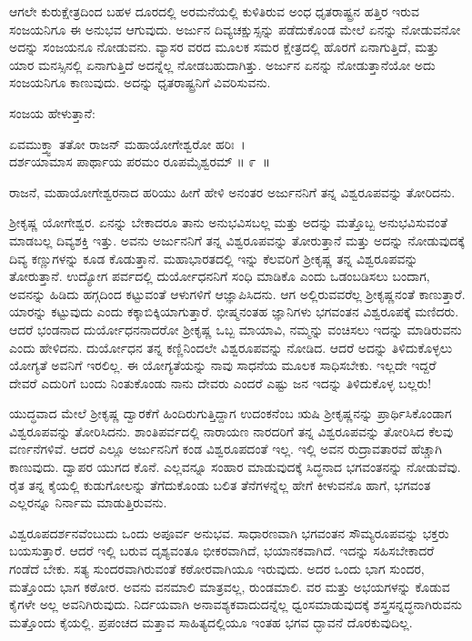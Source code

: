 ಆಗಲೇ ಕುರುಕ್ಷೇತ್ರದಿಂದ ಬಹಳ ದೂರದಲ್ಲಿ ಅರಮನೆಯಲ್ಲಿ ಕುಳಿತಿರುವ ಅಂಧ ಧೃತರಾಷ್ಟ್ರನ ಹತ್ತಿರ ಇರುವ ಸಂಜಯನಿಗೂ ಈ ಅನುಭವ ಆಗುವುದು. ಅರ್ಜುನ ದಿವ್ಯಚಕ್ಷುಸ್ಸನ್ನು ಪಡೆದುಕೊಂಡ ಮೇಲೆ ಏನನ್ನು ನೋಡುವನೋ ಅದನ್ನು ಸಂಜಯನೂ ನೋಡುವನು. ವ್ಯಾಸರ ವರದ ಮೂಲಕ ಸಮರ ಕ್ಷೇತ್ರದಲ್ಲಿ ಹೊರಗೆ ಏನಾಗುತ್ತಿದೆ, ಮತ್ತು ಯಾರ ಮನಸ್ಸಿನಲ್ಲಿ ಏನಾಗುತ್ತಿದೆ ಅದನ್ನೆಲ್ಲ ನೋಡಬಹುದಾಗಿತ್ತು. ಅರ್ಜುನ ಏನನ್ನು ನೋಡುತ್ತಾನೆಯೋ ಅದು ಸಂಜಯನಿಗೂ ಕಾಣುವುದು. ಅದನ್ನು ಧೃತರಾಷ್ಟ್ರನಿಗೆ ವಿವರಿಸುವನು.

ಸಂಜಯ ಹೇಳುತ್ತಾನೆ:

\begin{shloka}
ಏವಮುಕ್ತ್ವಾ ತತೋ ರಾಜನ್ ಮಹಾಯೋಗೇಶ್ವರೋ ಹರಿಃ~।\\ದರ್ಶಯಾಮಾಸ ಪಾರ್ಥಾಯ ಪರಮಂ ರೂಪಮೈಶ್ವರಮ್ \hfill॥ ೯~॥
\end{shloka}

\begin{artha}
ರಾಜನೆ, ಮಹಾಯೋಗೇಶ್ವರನಾದ ಹರಿಯು ಹೀಗೆ ಹೇಳಿ ಅನಂತರ ಅರ್ಜುನನಿಗೆ ತನ್ನ ವಿಶ್ವರೂಪವನ್ನು ತೋರಿದನು.
\end{artha}

ಶ‍್ರೀಕೃಷ್ಣ ಯೋಗೇಶ್ವರ. ಏನನ್ನು ಬೇಕಾದರೂ ತಾನು ಅನುಭವಿಸಬಲ್ಲ ಮತ್ತು ಅದನ್ನು ಮತ್ತೊಬ್ಬ ಅನುಭವಿಸುವಂತೆ ಮಾಡಬಲ್ಲ ದಿವ್ಯಶಕ್ತಿ ಇತ್ತು. ಅವನು ಅರ್ಜುನನಿಗೆ ತನ್ನ ವಿಶ್ವರೂಪವನ್ನು ತೋರುತ್ತಾನೆ ಮತ್ತು ಅದನ್ನು ನೋಡುವುದಕ್ಕೆ ದಿವ್ಯ ಕಣ್ಣುಗಳನ್ನು ಕೂಡ ಕೊಡುತ್ತಾನೆ. ಮಹಾಭಾರತದಲ್ಲಿ ಇನ್ನು ಕೆಲವರಿಗೆ ಶ‍್ರೀಕೃಷ್ಣ ತನ್ನ ವಿಶ್ವರೂಪವನ್ನು ತೋರುತ್ತಾನೆ. ಉದ್ಯೋಗ ಪರ್ವದಲ್ಲಿ ದುರ್ಯೋಧನನಿಗೆ ಸಂಧಿ ಮಾಡಿಕೊ ಎಂದು ಒಡಂಬಡಿಸಲು ಬಂದಾಗ, ಅವನನ್ನು ಹಿಡಿದು ಹಗ್ಗದಿಂದ ಕಟ್ಟುವಂತೆ ಆಳುಗಳಿಗೆ ಆಜ್ಞಾಪಿಸಿದನು. ಆಗ ಅಲ್ಲಿರುವವರೆಲ್ಲ ಶ‍್ರೀಕೃಷ್ಣನಂತೆ ಕಾಣುತ್ತಾರೆ. ಯಾರನ್ನು ಕಟ್ಟುವುದು ಎಂದು ಕಕ್ಕಾಬಿಕ್ಕಿಯಾಗುತ್ತಾರೆ. ಭೀಷ್ಮನಂತಹ ಜ್ಞಾನಿಗಳು ಭಗವಂತನ ವಿಶ್ವರೂಪಕ್ಕೆ ಮಣಿದರು. ಆದರೆ ಭಂಡನಾದ ದುರ್ಯೋಧನನಾದರೋ ಶ‍್ರೀಕೃಷ್ಣ ಒಬ್ಬ ಮಾಯಾವಿ, ನಮ್ಮನ್ನು ವಂಚಿಸಲು ಇದನ್ನು ಮಾಡಿರುವನು ಎಂದು ಹೇಳಿದನು. ದುರ್ಯೋಧನ ತನ್ನ ಕಣ್ಣಿನಿಂದಲೇ ವಿಶ್ವರೂಪವನ್ನು ನೋಡಿದ. ಆದರೆ ಅದನ್ನು ತಿಳಿದುಕೊಳ್ಳಲು ಯೋಗ್ಯತೆ ಅವನಿಗೆ ಇರಲಿಲ್ಲ. ಈ ಯೋಗ್ಯತೆಯನ್ನು ನಾವು ಸಾಧನೆಯ ಮೂಲಕ ಸಾಧಿಸಬೇಕು. ಇಲ್ಲದೇ ಇದ್ದರೆ ದೇವರೆ ಎದುರಿಗೆ ಬಂದು ನಿಂತುಕೊಂಡು ನಾನು ದೇವರು ಎಂದರೆ ಎಷ್ಟು ಜನ ಇದನ್ನು ತಿಳಿದುಕೊಳ್ಳ ಬಲ್ಲರು!

ಯುದ್ಧವಾದ ಮೇಲೆ ಶ‍್ರೀಕೃಷ್ಣ ದ್ವಾರಕೆಗೆ ಹಿಂದಿರುಗುತ್ತಿದ್ದಾಗ ಉದಂಕನೆಂಬ ಋಷಿ ಶ‍್ರೀಕೃಷ್ಣನನ್ನು ಪ್ರಾರ್ಥಿಸಿಕೊಂಡಾಗ ವಿಶ್ವರೂಪವನ್ನು ತೋರಿಸಿದನು. ಶಾಂತಿಪರ್ವದಲ್ಲಿ ನಾರಾಯಣ ನಾರದರಿಗೆ ತನ್ನ ವಿಶ್ವರೂಪವನ್ನು ತೋರಿಸಿದ ಕೆಲವು ವರ್ಣನೆಗಳಿವೆ. ಆದರೆ ಎಲ್ಲೂ ಅರ್ಜುನನಿಗೆ ಕಂಡ ವಿಶ್ವರೂಪದಂತೆ ಇಲ್ಲ. ಇಲ್ಲಿ ಅವನ ರುದ್ರಾವತಾರವೆ ಹೆಚ್ಚಾಗಿ ಕಾಣುವುದು. ದ್ವಾಪರ ಯುಗದ ಕೊನೆ. ಎಲ್ಲವನ್ನೂ ಸಂಹಾರ ಮಾಡುವುದಕ್ಕೆ ಸಿದ್ಧನಾದ ಭಗವಂತನನ್ನು ನೋಡುವೆವು. ರೈತ ತನ್ನ ಕೈಯಲ್ಲಿ ಕುಡುಗೋಲನ್ನು ತೆಗೆದುಕೊಂಡು ಬಲಿತ ತೆನೆಗಳನ್ನೆಲ್ಲ ಹೇಗೆ ಕೀಳುವನೊ ಹಾಗೆ, ಭಗವಂತ ಎಲ್ಲರನ್ನೂ ನಿರ್ನಾಮ ಮಾಡುತ್ತಿರುವನು.

ವಿಶ್ವರೂಪದರ್ಶನವೆಂಬುದು ಒಂದು ಅಪೂರ್ವ ಅನುಭವ. ಸಾಧಾರಣವಾಗಿ ಭಗವಂತನ ಸೌಮ್ಯರೂಪವನ್ನು ಭಕ್ತರು ಬಯಸುತ್ತಾರೆ. ಆದರೆ ಇಲ್ಲಿ ಬರುವ ದೃಶ್ಯವಂತೂ ಭೀಕರವಾಗಿದೆ, ಭಯಾನಕವಾಗಿದೆ. ಇದನ್ನು ಸಹಿಸಬೇಕಾದರೆ ಗಂಡೆದೆ ಬೇಕು. ಸತ್ಯ ಸುಂದರವಾಗಿರುವಂತೆ ಕಠೋರವಾಗಿಯೂ ಇರುವುದು. ಅದರ ಒಂದು ಭಾಗ ಸುಂದರ, ಮತ್ತೊಂದು ಭಾಗ ಕಠೋರ. ಅವನು ವನಮಾಲಿ ಮಾತ್ರವಲ್ಲ, ರುಂಡಮಾಲಿ. ವರ ಮತ್ತು ಅಭಯಗಳನ್ನು ಕೊಡುವ ಕೈಗಳೇ ಅಲ್ಲ ಅವನಿಗಿರುವುದು. ನಿರ್ದಯವಾಗಿ ಅನಾವಶ್ಯಕವಾದುದನ್ನೆಲ್ಲ ಧ್ವಂಸಮಾಡುವುದಕ್ಕೆ ಶಸ್ತ್ರಸನ್ನದ್ಧನಾಗಿರುವನು ಮತ್ತೊಂದು ಕೈಯಲ್ಲಿ. ಪ್ರಪಂಚದ ಮತ್ತಾವ ಸಾಹಿತ್ಯದಲ್ಲಿಯೂ ಇಂತಹ ಭಗವ ದ್ಭಾವನೆ ದೊರಕುವುದಿಲ್ಲ.

